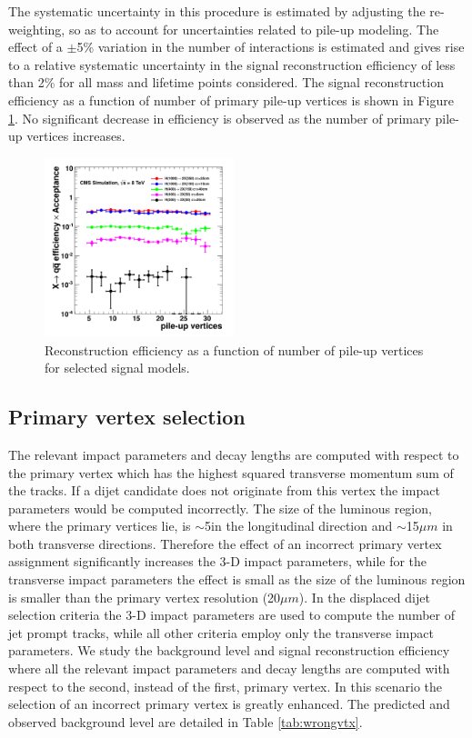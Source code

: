 The systematic uncertainty in this procedure is estimated by adjusting the re-weighting, so as to account
 for uncertainties related to pile-up modeling. 
The effect of a $\pm$5\% variation in the number of interactions is estimated and gives rise 
to a relative systematic uncertainty in the signal reconstruction efficiency 
of less than 2\% for all mass and lifetime points considered. The signal reconstruction efficiency as
a function of number of primary pile-up vertices is shown in Figure \ref{fig:effPU}. No significant
decrease in efficiency is observed as the number of primary pile-up vertices increases.

\begin{figure}[htbp]
\centering
\includegraphics[width=0.49\textwidth]{plots/signal/effPU.pdf}
\caption{Reconstruction efficiency as a function of number of pile-up vertices for selected
signal models.\label{fig:effPU}}
\end{figure}

\subsection{Primary vertex selection}
\label{subsec:pv}
The relevant impact parameters and decay lengths are computed 
with respect to the primary vertex which has the highest
squared transverse momentum sum of the tracks. If a dijet candidate does not originate from this vertex the impact
parameters would be computed incorrectly. The size of the luminous region, where the primary vertices lie,
 is $\sim$5\cm in the longitudinal direction and $\sim$15$\mu m$ in both transverse directions. 
Therefore the effect of an incorrect primary vertex assignment significantly increases the 3-D impact parameters,
 while for
the transverse impact parameters the effect is small as the size of the luminous region is smaller than the 
primary vertex resolution (20$\mu m$).
In the displaced dijet selection criteria the 3-D impact parameters are used to compute 
the number of jet prompt tracks, while all other criteria employ
only the transverse impact parameters. 
 We study the background level and signal reconstruction efficiency where all
 the relevant impact parameters and
decay lengths are computed with respect to the second, instead of the first, primary vertex. In this scenario 
the selection of an incorrect primary vertex is greatly enhanced. The predicted and
observed background level are detailed in Table \ref{tab:wrongvtx}.

